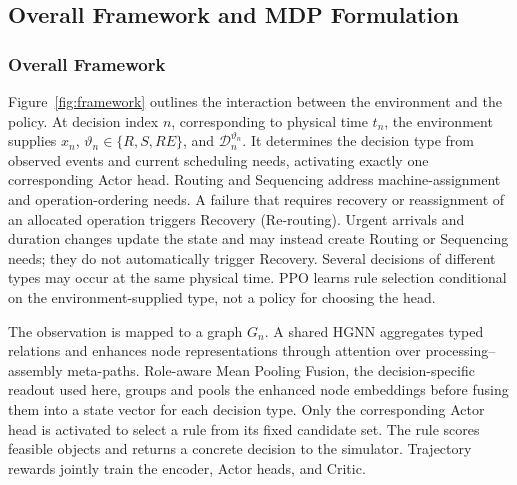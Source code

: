 \subsection{Overall Framework and MDP Formulation}
\label{subsec:framework_overview}

\subsubsection{Overall Framework}
\label{subsubsec:overall_framework}

Figure~\ref{fig:framework} outlines the interaction between the environment and the policy.
At decision index $n$, corresponding to physical time $t_n$, the environment supplies $x_n$,
$\vartheta_n\in\{R,S,RE\}$, and $\mathcal D_n^{\vartheta_n}$. It determines the decision type
from observed events and current scheduling needs, activating exactly one corresponding Actor head.
Routing and Sequencing address machine-assignment and operation-ordering needs. A failure that
requires recovery or reassignment of an allocated operation triggers Recovery (Re-routing).
Urgent arrivals and duration changes update the state and may instead create Routing or Sequencing
needs; they do not automatically trigger Recovery. Several decisions of different types may occur
at the same physical time. PPO learns rule selection conditional on the environment-supplied type,
not a policy for choosing the head.


The observation is mapped to a graph $G_n$. A shared HGNN aggregates typed relations and enhances node
representations through attention over processing--assembly meta-paths. Role-aware Mean Pooling
Fusion, the decision-specific readout used here, groups and pools the enhanced node embeddings
before fusing them into a state vector for each decision type. Only the corresponding Actor head is activated to select
a rule from its fixed candidate set. The rule scores feasible objects and returns a concrete decision to the simulator.
Trajectory rewards jointly train the encoder, Actor heads, and Critic.

